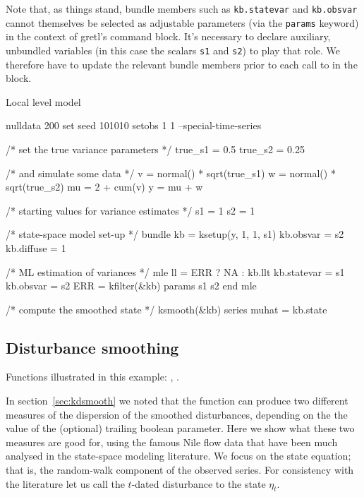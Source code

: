 \documentclass[a4paper]{article}
\begin{document}
Note that, as things stand, bundle members such as
\texttt{kb.statevar} and \texttt{kb.obsvar} cannot themselves be
selected as adjustable parameters (via the \texttt{params} keyword) in
the context of gretl's  command block. It's necessary to
declare auxiliary, unbundled variables (in this case the scalars
\texttt{s1} and \texttt{s2}) to play that role.  We therefore have to
update the relevant bundle members prior to each call to 
in the  block.

\begin{script}[htbp]
  \caption{Local level model}
  \label{script:loclev}
\begin{scode}
nulldata 200
set seed 101010
setobs 1 1 --special-time-series

/* set the true variance parameters */
true_s1 = 0.5
true_s2 = 0.25

/* and simulate some data */
v = normal() * sqrt(true_s1)
w = normal() * sqrt(true_s2)
mu = 2 + cum(v)
y = mu + w

/* starting values for variance estimates */
s1 = 1
s2 = 1

/* state-space model set-up */
bundle kb = ksetup(y, 1, 1, s1)
kb.obsvar = s2
kb.diffuse = 1

/* ML estimation of variances */
mle ll = ERR ? NA : kb.llt
    kb.statevar = s1
    kb.obsvar = s2
    ERR = kfilter(&kb)
    params s1 s2
end mle

/* compute the smoothed state */
ksmooth(&kb)
series muhat = kb.state
\end{scode}
\end{script}

\subsection{Disturbance smoothing}
\label{sec:example_dsmooth}

Functions illustrated in this example: , .

In section~\ref{sec:kdsmooth} we noted that the 
function can produce two different measures of the dispersion of the
smoothed disturbances, depending on the the value of the (optional)
trailing boolean parameter. Here we show what these two measures are
good for, using the famous Nile flow data that have been much analysed
in the state-space modeling literature. We focus on the state
equation; that is, the random-walk component of the observed series.
For consistency with the literature let us call the $t$-dated
disturbance to the state $\eta_t$.
\end{document}
